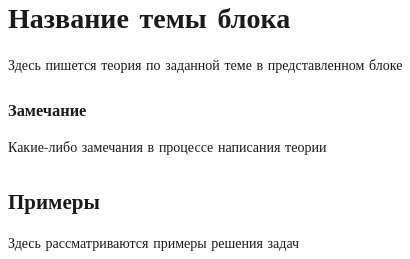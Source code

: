 \section{Название темы блока}

	Здесь пишется теория по заданной теме в представленном блоке

	\subsubsection*{Замечание}
		Какие-либо замечания в процессе написания теории


	\subsection{Примеры}

		Здесь рассматриваются примеры решения задач

	\pagebreak
